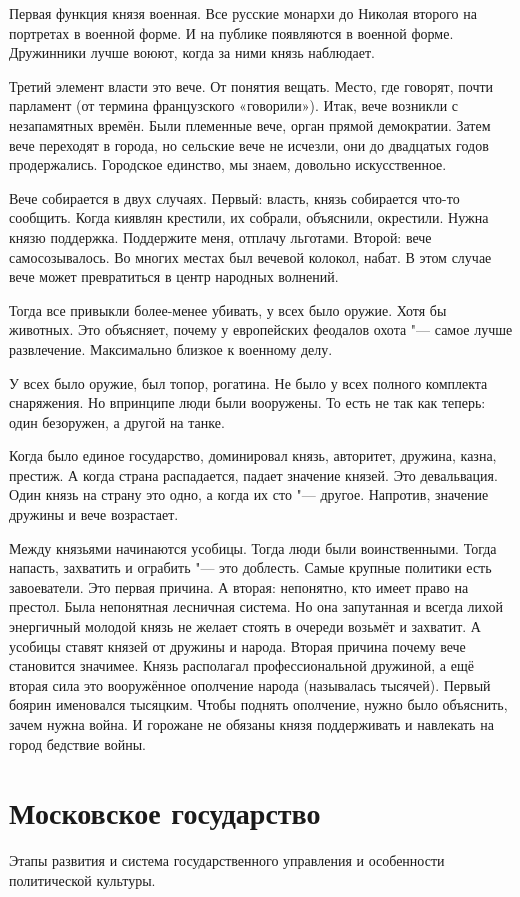  Первая функция князя военная. Все русские монархи до Николая второго на портретах в военной форме. И на публике появляются в военной форме. Дружинники лучше воюют, когда за ними князь наблюдает.

Третий элемент власти это вече. От понятия вещать. Место, где говорят, почти парламент (от термина французского «говорили»). Итак, вече возникли с незапамятных времён. Были племенные вече, орган прямой демократии. Затем вече переходят в города, но сельские вече не исчезли, они до двадцатых годов продержались. Городское единство, мы знаем, довольно искусственное.

Вече собирается в двух случаях. Первый: власть, князь собирается что-то сообщить. Когда киявлян крестили, их собрали, объяснили, окрестили. Нужна князю поддержка. Поддержите меня, отплачу льготами. Второй: вече самосозывалось. Во многих местах был вечевой колокол, набат. В этом случае вече может превратиться в центр народных волнений.

Тогда все привыкли более-менее убивать, у всех было оружие. Хотя бы животных. Это объясняет, почему у европейских феодалов охота "--- самое лучше развлечение. Максимально близкое к военному делу.

У всех было оружие, был топор, рогатина. Не было у всех полного комплекта снаряжения. Но впринципе люди были вооружены. То есть не так как теперь: один безоружен, а другой на танке.

Когда было единое государство, доминировал князь, авторитет, дружина, казна, престиж. А когда страна распадается, падает значение князей. Это девальвация. Один князь на страну это одно, а когда их сто "--- другое. Напротив, значение дружины и вече возрастает.

Между князьями начинаются усобицы. Тогда люди были воинственными. Тогда напасть, захватить и ограбить "--- это доблесть. Самые крупные политики есть завоеватели. Это первая причина. А вторая: непонятно, кто имеет право на престол. Была непонятная лесничная система. Но она запутанная и всегда лихой энергичный молодой князь не желает стоять в очереди возьмёт и захватит. А усобицы ставят князей от дружины и народа. Вторая причина почему вече становится значимее. Князь располагал профессиональной дружиной, а ещё вторая сила это вооружённое ополчение народа (называлась тысячей). Первый боярин именовался тысяцким. Чтобы поднять ополчение, нужно было объяснить, зачем нужна война. И горожане не обязаны князя поддерживать и навлекать на город бедствие войны.

\section{Московское государство}
Этапы развития и система государственного управления и особенности политической культуры.

